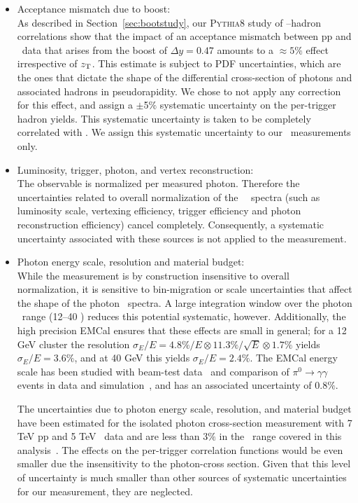 \begin{itemize}
\item Acceptance mismatch due to boost:\\
As described in Section~\ref{sec:bootstudy}, our \textsc{Pythia8} study of \gammaiso--hadron correlations show that the impact of an acceptance mismatch between pp and \pPb~data that arises from the boost of $\Delta y = 0.47$ amounts to a $\approx5\%$ effect irrespective of $z_{\mathrm{T}}$. This estimate is subject to PDF uncertainties, which are the ones that dictate the shape of the differential cross-section of photons and associated hadrons in pseudorapidity. We chose to not apply any correction for this effect, and assign a $\pm$5$\%$ systematic uncertainty on the per-trigger hadron yields. This systematic uncertainty is taken to be completely correlated with \zt. We assign this systematic uncertainty to our \pPb~measurements only. 


\item Luminosity, trigger, photon, and vertex reconstruction:\\
The observable is normalized per measured photon. Therefore the uncertainties related to overall normalization of the \gammaiso~\pt~spectra (such as luminosity scale, vertexing efficiency, trigger efficiency and photon reconstruction efficiency) cancel completely. Consequently, a systematic uncertainty associated with these sources is not applied to the measurement. 

\item Photon energy scale, resolution and material budget:\\
  While the measurement is  by construction insensitive to overall normalization, it is sensitive to bin-migration or scale uncertainties that affect the shape of the photon \pt~spectra.  A large integration window over the photon \pt~range (12--40 \GeVc) reduces this potential systematic, however. Additionally, the high precision EMCal ensures that these effects are small in general; for a 12 GeV cluster the resolution  $\sigma_{E}/E = 4.8\%/E\otimes 11.3\%/\sqrt{E}\otimes 1.7\%$ yields $\sigma_{E}/E =3.6\%$, and at 40 GeV this yields $\sigma_{E}/E =2.4\%$. The EMCal energy scale has been studied with beam-test data~\cite{Allen:2009aa} and comparison of $\pi^{0}\to\gamma\gamma$ events in data and simulation~\cite{Adam:2016khe}, and has an associated uncertainty of 0.8$\%$. 

The uncertainties due to photon energy scale, resolution, and material budget have been estimated for the isolated photon cross-section measurement with 7 TeV pp and 5 TeV \pPb~data and are less than 3$\%$ in the \pt~range covered in this analysis~\cite{Erwann,Acharya:2019jkx}. The effects on the per-trigger correlation functions would be even smaller due the insensitivity to the photon-cross section. Given that this level of uncertainty is much smaller than other sources of systematic uncertainties for our measurement, they are neglected. 
\end{itemize}

